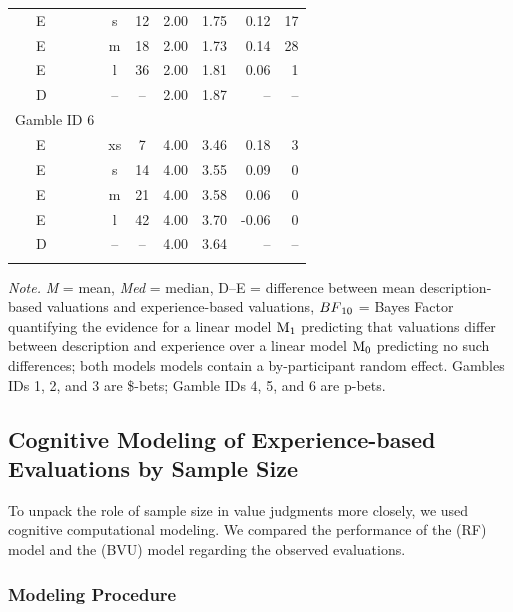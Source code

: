 \documentclass[a4paper, man, floatsintext]{apa6}
\begin{document}
\begin{table}[tbp]
\begin{center}
\begin{threeparttable}
\begin{tabular}{lccccrr}
\ \ \ E & s & 12 & 2.00 & 1.75 & 0.12 & 17\\
\ \ \ E & m & 18 & 2.00 & 1.73 & 0.14 & 28\\
\ \ \ E & l & 36 & 2.00 & 1.81 & 0.06 & 1\\
\ \ \ D & -- & -- & 2.00 & 1.87 & -- & --\\
Gamble ID 6 &  &  &  &  &  & \\
\ \ \ E & xs & 7 & 4.00 & 3.46 & 0.18 & 3\\
\ \ \ E & s & 14 & 4.00 & 3.55 & 0.09 & 0\\
\ \ \ E & m & 21 & 4.00 & 3.58 & 0.06 & 0\\
\ \ \ E & l & 42 & 4.00 & 3.70 & -0.06 & 0\\
\ \ \ D & -- & -- & 4.00 & 3.64 & -- & --\\
\bottomrule
\addlinespace
\end{tabular}
\begin{tablenotes}[para]
\normalsize{\textit{Note.} \textit{M} = mean, \textit{Med} = median, D--E = difference between mean description-based valuations and experience-based valuations, $BF\textsubscript{10}$ = Bayes Factor quantifying the evidence for a linear model $\mathrm{M}\textsubscript{1}$ predicting that valuations differ between description and experience over a linear model $\mathrm{M}\textsubscript{0}$ predicting no such differences; both models models contain a by-participant random effect. Gambles IDs 1, 2, and 3 are \$-bets; Gamble IDs 4, 5, and 6 are p-bets.}
\end{tablenotes}
\end{threeparttable}
\end{center}
\end{table}

\subsection{Cognitive Modeling of Experience-based Evaluations by Sample Size}

To unpack the role of sample size in value judgments more closely, we
used cognitive computational modeling. We compared the performance of
the  (RF) model and the
 (BVU) model regarding the
observed evaluations.

\subsubsection{Modeling Procedure}
\end{document}
